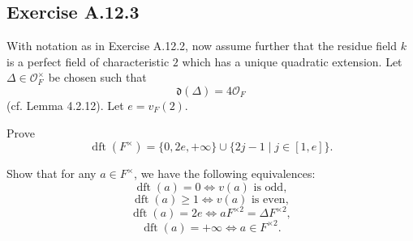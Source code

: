 \documentclass[12pt, a4paper]{article}
\begin{document}
\subsection*{Exercise A.12.3}

With notation as in Exercise A.12.2, now assume further that the residue field
$k$ is a perfect field of characteristic $2$ which has a unique quadratic
extension. Let $\Delta\in \mathcal O_F^\times$ be chosen such that
\[
    \mathfrak d(\Delta)=4\mathcal O_F
\]
(cf. Lemma 4.2.12). Let $e=v_F(2)$.

Prove
\[
    \operatorname{dft}(F^\times)
    =
    \{0,2e,+\infty\}
    \cup
    \{2j-1\mid j\in [1,e]\}.
\]

Show that for any $a\in F^\times$, we have the following equivalences:
\[
    \operatorname{dft}(a)=0
    \Longleftrightarrow
    v(a)\text{ is odd},
\]
\[
    \operatorname{dft}(a)\geq 1
    \Longleftrightarrow
    v(a)\text{ is even},
\]
\[
    \operatorname{dft}(a)=2e
    \Longleftrightarrow
    aF^{\times 2}=\Delta F^{\times 2},
\]
\[
    \operatorname{dft}(a)=+\infty
    \Longleftrightarrow
    a\in F^{\times 2}.
\]
\end{document}
